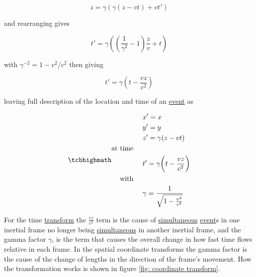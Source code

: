 \begin{equation}
	z = \gamma ( \gamma (z-vt)+vt')
\end{equation}

and rearranging gives

\begin{equation}
	t' = \gamma \left( \left( \dfrac{1}{\gamma^2}-1 \right)\frac{z}{v} + t \right)
\end{equation}

with $\gamma^{-2}=1-v^2/c^2$ then giving

\begin{equation}
	t' = \gamma \left( t - \dfrac{vz}{c^2} \right)
\end{equation}

leaving full description of the location and time of an \hyperlink{def-event}{event} as

\begin{equation}
	\mhl{
		\begin{aligned}
			 & x'=x                                         \\
			 & y'=y                                         \\
			 & z' = \gamma (z-vt)                           \\
			\text{at time \ \ \ }                           \\
			 & t'=\gamma \bigg(t-\frac{vz}{c^2}\bigg)       \\
			\text{with \ \ \ }                              \\
			 & \gamma = \dfrac{1}{\sqrt{1-\frac{v^2}{c^2}}}
		\end{aligned}
	}
	\label{eq: Lorentz transformation}
\end{equation}

For the time \hyperlink{def-transform}{transform} the $\frac{vz}{c^2}$ term is the cause of \hyperlink{def-simultaneity}{simultaneous} \hyperlink{def-event}{event}s in one inertial frame no longer being \hyperlink{def-simultaneity}{simultaneous} in another inertial frame, and the gamma factor $\gamma$, is the term that causes the overall change in how fast time flows relative in each frame. In the spatial coordinate transforms the gamma factor is the cause of the change of lengths in the direction of the frame's movement. How the transformation works is shown in figure \ref{fig: coordinate transform}.

